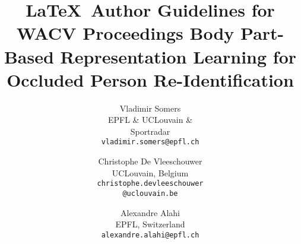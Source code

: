 \documentclass[10pt,twocolumn,letterpaper]{article}
\begin{document}
\title{\LaTeX\ Author Guidelines for WACV Proceedings}










\author{Vladimir Somers\\
EPFL \& UCLouvain \& \\ Sportradar\\
{\tt\small vladimir.somers@epfl.ch}
\and
Christophe De Vleeschouwer\\
UCLouvain, Belgium\\
{\tt\small christophe.devleeschouwer} \\ {\tt\small @uclouvain.be}
\and
Alexandre Alahi\\
EPFL, Switzerland \\
{\tt\small alexandre.alahi@epfl.ch}
}

\title{\LARGE \bf
Body Part-Based Representation Learning for Occluded Person Re-Identification
}




\maketitle
\thispagestyle{empty}




\newcommand\model{BPBreID}
\newcommand\G{G}
\newcommand\ffg{f_{fg}}
\newcommand\fgl{f_{gl}}
\newcommand\fcc{f_{cc}}
\newcommand\Y{Y}
\newcommand\scores{M} \newcommand\A{A}
\newcommand\F{F}
\newcommand\glb{hol}
\newcommand\lcl{part}
\newcommand\reid{ReID}

 
\end{document}
